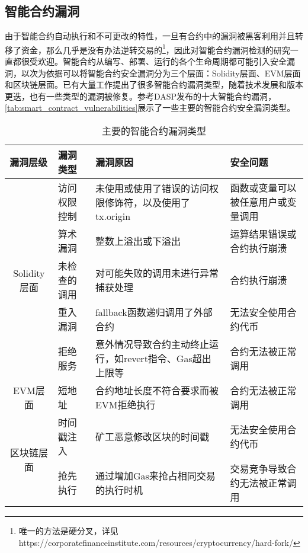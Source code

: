 \subsection{智能合约漏洞}
\label{sec:智能合约漏洞}
由于智能合约自动执行和不可更改的特性，一旦有合约中的漏洞被黑客利用并且转移了资金，那么几乎是没有办法逆转交易的\footnote{唯一的方法是硬分叉，详见https://corporatefinanceinstitute.com/resources/cryptocurrency/hard-fork/}，因此对智能合约漏洞检测的研究一直都很受欢迎。智能合约从编写、部署、运行的各个生命周期都可能引入安全漏洞，以次为依据可以将智能合约安全漏洞分为三个层面：Solidity层面、EVM层面和区块链层面。已有大量工作提出了很多智能合约漏洞类型，随着技术发展和版本更迭，也有一些类型的漏洞被修复。参考DASP发布的十大智能合约漏洞\cite{dasp10}，\autoref{tab:smart_contract_vulnerabilities}展示了一些主要的智能合约安全漏洞类型。
\begin{table}[htbp]
    \caption{\label{tab:smart_contract_vulnerabilities}主要的智能合约漏洞类型}
    \small
            \renewcommand{\arraystretch}{1.5}
        \begin{tabularx}{\linewidth}{cp{3cm}<{\centering}X<{\centering}X<{\centering}}

    \hline
    \multicolumn{1}{l}{漏洞层级}    & 漏洞类型   & 漏洞原因                              & 安全问题    \\ \hline
    \multirow{5}{*}{Solidity层面} & 访问权限控制 & 未使用或使用了错误的访问权限修饰符，以及使用了tx.origin  & 函数或变量可以被任意用户或变量调用 \\
                                & 算术漏洞   & 整数上溢出或下溢出                         & 运算结果错误或合约执行崩溃 \\
                                & 未检查的调用 & 对可能失败的调用未进行异常捕获处理                 & 合约执行崩溃 \\
                                & 重入漏洞   & fallback函数递归调用了外部合约               & 无法安全使用合约代币 \\
                                & 拒绝服务   & 意外情况导致合约主动终止运行，如revert指令、Gas超出上限等 & 合约无法被正常调用 \\ \hline
    EVM层面                       & 短地址    & 合约地址长度不符合要求而被EVM拒绝执行              & 合约无法被正常调用 \\ \hline
    \multirow{3}{*}{区块链层面}      & 时间戳注入  & 矿工恶意修改区块的时间戳                      & 无法安全使用合约代币 \\
                                & 抢先执行   & 通过增加Gas来抢占相同交易的执行时机             & 交易竞争导致合约无法被正常调用 \\ \hline
        \end{tabularx}
\end{table}
